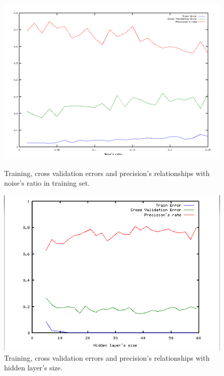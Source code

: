 \documentclass[a4paper, 11pt]{article}
\begin{document}
\begin{figure}[t]
  \centering
  \includegraphics[scale=0.45]{3}
  \caption{Training, cross validation errors and precision's relationships with noise's ratio in training set.}
  \label{fig:m3}
  \includegraphics[scale=0.8]{4}
  \caption{Training, cross validation errors and precision's relationships with hidden layer's size.}
\end{figure}
\end{document}
